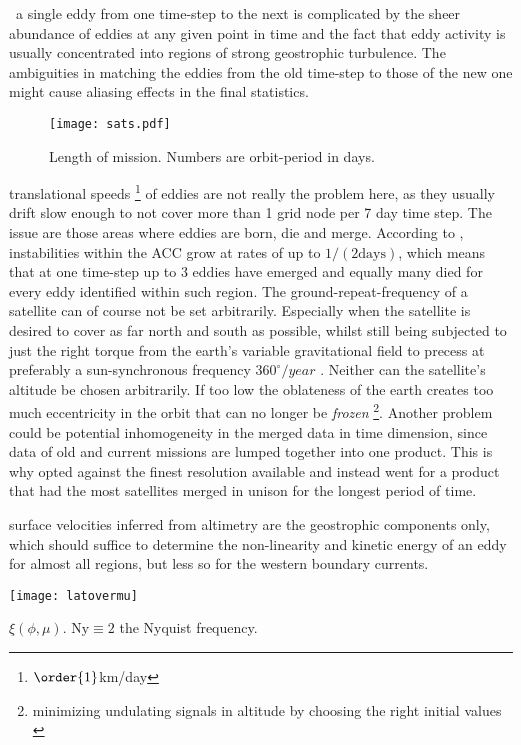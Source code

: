 ~a single eddy from one time-step to the next is complicated by the sheer abundance of eddies at any given point in time and the fact that eddy activity is usually concentrated into regions of strong geostrophic turbulence.
The ambiguities in matching the eddies from the old time-step to those of the new one might cause aliasing effects in the final statistics.
\begin{figure}
\texttt{[image: sats.pdf]}
\caption{Length of mission. Numbers are orbit-period in days.}
\label{fig:lengthOfMission}
\end{figure}

  translational speeds \footnote{$\order{1}$km/day} of eddies are not really the problem here, as they usually drift slow enough to not cover more
than 1 grid node per 7 day time step. The issue are those areas where eddies are born, die and merge. According to \citet{Smith2009}, instabilities within the ACC
grow at rates of up to $1/(2 \mathrm{days})$, which means that at one time-step up to 3 eddies have emerged and equally many died for every eddy identified within
such region. The ground-repeat-frequency of a satellite can of course not be set arbitrarily. Especially when the satellite is desired to cover as far north and
south as possible, whilst still being subjected to just the right torque from the earth's variable gravitational field to precess at preferably a
sun-synchronous frequency \ie $360^{\circ}/year$ \citep{goldreich1965inclination}. Neither can the
satellite's altitude be chosen arbitrarily. If too low the oblateness of the earth creates too much eccentricity in the orbit that can no longer be
\textit{frozen} \footnote{minimizing undulating signals in altitude by choosing the right initial values \citep{goldreich1965inclination}}. Another problem could be potential inhomogeneity in
the merged data in time dimension, since data of old and current missions are lumped together into one product. This is why \citet{Chelton2011} opted against
the finest resolution available and instead went for a product that had the most satellites merged in unison for the longest period of time.

 surface velocities inferred from altimetry are the geostrophic components only, which should suffice to \eg determine the non-linearity and kinetic energy of an eddy for almost all regions, but less so for \eg the western boundary currents.
\begin{marginfigure}
\texttt{[image: latovermu]}
\caption{$\xi(\phi,\mu)$. $\mathrm{Ny}\equiv 2$ \ie the Nyquist frequency.}
\label{fig:latovermu}
\end{marginfigure}

